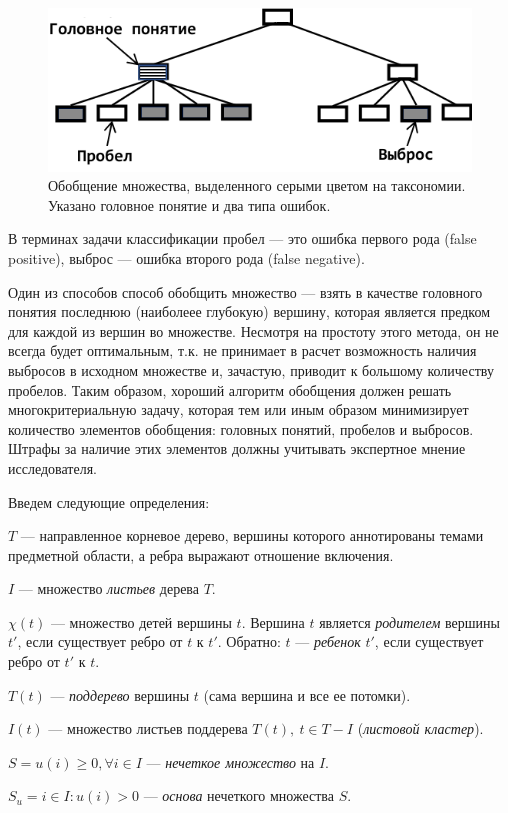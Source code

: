 \documentclass[12pt]{article}
\newenvironment{itemize*}%
{\begin{itemize}%
		\setlength{\itemsep}{0pt}%
		\setlength{\parskip}{0pt}}%
	{\end{itemize}}
\begin{document}
\begin{figure}
\centering
\includegraphics[width=0.5\linewidth]{images/gap_offshoot_example}
\caption{Обобщение множества, выделенного серыми цветом на таксономии. Указано головное понятие и два типа ошибок.}
\label{fig:gap_offshoot_example}
\end{figure}

В терминах задачи классификации пробел --- это  ошибка первого рода (false positive), выброс --- ошибка второго рода (false negative). 

Один из способов способ обобщить множество --- взять в качестве головного понятия последнюю (наиболеее глубокую) вершину, которая является предком для каждой из вершин во множестве. Несмотря на простоту этого метода, он не всегда будет оптимальным, т.к. не принимает в расчет возможность наличия выбросов в исходном множестве и, зачастую, приводит к большому количеству пробелов. Таким образом, хороший алгоритм обобщения должен решать многокритериальную задачу, которая тем или иным образом минимизирует количество элементов обобщения: головных понятий, пробелов и выбросов. Штрафы за наличие этих элементов должны учитывать экспертное мнение исследователя. 

Введем следующие определения:
\begin{itemize*}
	\item $T$ --- направленное корневое дерево, вершины которого аннотированы темами предметной области, а ребра выражают отношение включения.
	\item $I$ --- множество \textit{листьев} дерева $T$.
	\item $\chi(t)$ --- множество детей вершины $t$. Вершина $t$ является \textit{родителем} вершины $t'$, если существует ребро от $t$ к $t'$. Обратно: $t$ --- \textit{ребенок} $t'$, если существует ребро от $t'$ к $t$.
	\item $T(t)$ --- \textit{поддерево} вершины $t$ (сама вершина и все ее потомки).
	\item $I(t)$ --- множество листьев поддерева $T(t), \ t\in T-I$ (\textit{листовой кластер}).
	
	\item $S={u(i)\geq0,\forall i\in I}$ --- \textit{нечеткое множество} на $I$.
	\item $S_u={i\in I: u(i)>0}$ --- \textit{основа} нечеткого множества $S$.
\end{itemize*}
\end{document}
